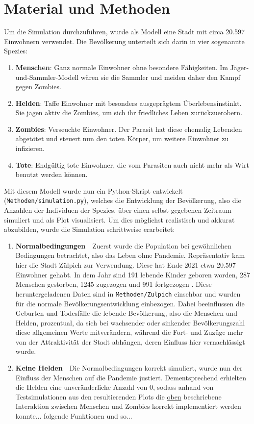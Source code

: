 \section{Material und Methoden} %
    \label{sec:material_und_methoden}
    Um die Simulation durchzuführen, wurde als Modell eine Stadt mit circa 20.597 Einwohnern verwendet. Die Bevölkerung unterteilt sich darin in vier sogenannte Spezies:
    \begin{enumerate}[1.]
        \item \textbf{Menschen}: Ganz normale Einwohner ohne besondere Fähigkeiten. Im Jäger-und-Sammler-Modell wären sie die Sammler und meiden daher den Kampf gegen Zombies.\label{species}
        \item \textbf{Helden}: Taffe Einwohner mit besonders ausgeprägtem Überlebensinstinkt. Sie jagen aktiv die Zombies, um sich ihr friedliches Leben zurückzuerobern.
        \item \textbf{Zombies}: Verseuchte Einwohner. Der Parasit hat diese ehemalig Lebenden abgetötet und steuert nun den toten Körper, um weitere Einwohner zu infizieren.
        \item \textbf{Tote}: Endgültig tote Einwohner, die vom Parasiten auch nicht mehr als Wirt benutzt werden können.
    \end{enumerate}
    Mit diesem Modell wurde nun ein Python-Skript entwickelt (\texttt{Methoden/simulation.py}), welches die Entwicklung der Bevölkerung, also die Anzahlen der Individuen der Spezies, über einen selbst gegebenen Zeitraum simuliert und als Plot visualisiert. Um dies möglichst realistisch und akkurat abzubilden, wurde die Simulation schrittweise erarbeitet:
    \begin{enumerate}[1.]
        \item \textbf{Normalbedingungen}\ \ Zuerst wurde die Population bei gewöhnlichen Bedingungen betrachtet, also das Leben ohne Pandemie. Repräsentativ kam hier die Stadt Zülpich zur Verwendung. Diese hat Ende 2021 etwa 20.597 Einwohner gehabt. In dem Jahr sind 191 lebende Kinder geboren worden, 287 Menschen gestorben, 1245 zugezogen und 991 fortgezogen \cite{zulpich}. Diese heruntergeladenen Daten sind in \texttt{Methoden/Zulpich} einsehbar und wurden für die normale Bevölkerungsentwicklung einbezogen. Dabei beeinflussen die Geburten und Todesfälle die lebende Bevölkerung, also die Menschen und Helden, prozentual, da sich bei wachsender oder sinkender Bevölkerungszahl diese allgemeinen Werte mitverändern, während die Fort- und Zuzüge mehr von der Attraktivität der Stadt abhängen, deren Einfluss hier vernachlässigt wurde.
        \item \textbf{Keine Helden}\ \ Die Normalbedingungen korrekt simuliert, wurde nun der Einfluss der Menschen auf die Pandemie justiert. Dementsprechend erhielten die Helden eine unveränderliche Anzahl von 0, sodass anhand von Testsimulationen aus den resultierenden Plots die \hyperref[species]{oben} beschriebene Interaktion zwischen Menschen und Zombies korrekt implementiert werden konnte... folgende Funktionen und so...
    \end{enumerate}

